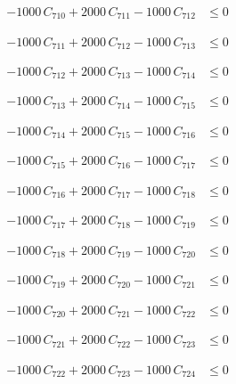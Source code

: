 \documentclass[a4paper,11pt]{article}
\begin{document}
\begin{align}
-1000\,C_{710} + 2000\,C_{711} - 1000\,C_{712} &\leq 0 \nonumber
\end{align}

\begin{align}
-1000\,C_{711} + 2000\,C_{712} - 1000\,C_{713} &\leq 0 \nonumber
\end{align}

\begin{align}
-1000\,C_{712} + 2000\,C_{713} - 1000\,C_{714} &\leq 0 \nonumber
\end{align}

\begin{align}
-1000\,C_{713} + 2000\,C_{714} - 1000\,C_{715} &\leq 0 \nonumber
\end{align}

\begin{align}
-1000\,C_{714} + 2000\,C_{715} - 1000\,C_{716} &\leq 0 \nonumber
\end{align}

\begin{align}
-1000\,C_{715} + 2000\,C_{716} - 1000\,C_{717} &\leq 0 \nonumber
\end{align}

\begin{align}
-1000\,C_{716} + 2000\,C_{717} - 1000\,C_{718} &\leq 0 \nonumber
\end{align}

\begin{align}
-1000\,C_{717} + 2000\,C_{718} - 1000\,C_{719} &\leq 0 \nonumber
\end{align}

\begin{align}
-1000\,C_{718} + 2000\,C_{719} - 1000\,C_{720} &\leq 0 \nonumber
\end{align}

\begin{align}
-1000\,C_{719} + 2000\,C_{720} - 1000\,C_{721} &\leq 0 \nonumber
\end{align}

\begin{align}
-1000\,C_{720} + 2000\,C_{721} - 1000\,C_{722} &\leq 0 \nonumber
\end{align}

\begin{align}
-1000\,C_{721} + 2000\,C_{722} - 1000\,C_{723} &\leq 0 \nonumber
\end{align}

\begin{align}
-1000\,C_{722} + 2000\,C_{723} - 1000\,C_{724} &\leq 0 \nonumber
\end{align}
\end{document}
